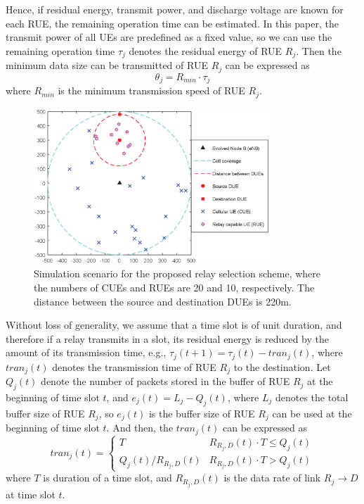 \documentclass[conference]{IEEEtran}
\begin{document}
Hence, if residual energy, transmit power, and discharge voltage are known for each RUE, the remaining operation time can be estimated. In this paper, the transmit power of all UEs are predefined as a fixed value, so we can use the remaining operation time $\tau_j$ denotes the residual energy of RUE $R_j$. Then the minimum data size can be transmitted of RUE $R_j$ can be expressed as
\begin{equation}
\theta_j = R_{min} \cdot \tau_j
\end{equation}
where $R_{min}$ is the minimum transmission speed of RUE $R_j$.
\begin{figure}[!t]
\center
\includegraphics[width=3.5in]{fig2}
\caption{Simulation scenario for the proposed relay selection scheme, where the numbers of CUEs and RUEs are 20 and 10, respectively. The distance between the source and destination DUEs is 220m.}
\label{fig_scenario}
\end{figure}
Without loss of generality, we assume that a time slot is of unit duration, and therefore if a relay transmits in a slot, its residual energy is reduced by the amount of its transmission time, e.g., $\tau_j(t+1) = \tau_j(t) - tran_j(t)$, where $tran_j(t)$ denotes the transmission time of RUE $R_j$ to the destination. Let $Q_j(t)$ denote the number of packets stored in the buffer of RUE $R_j$ at the beginning of time slot $t$, and $e_j(t) = L_j -  Q_j(t)$, where $L_j$ denotes the total buffer size of RUE $R_j$, so $e_j(t)$ is the buffer size of RUE $R_j$ can be used at the beginning of time slot $t$. And then, the $tran_j(t)$ can be expressed as
\begin{equation}
tran_j(t) = \begin{cases}T & R_{R_j,D}(t)\cdot T \leq Q_j(t)\\Q_j(t)/R_{R_j,D}(t) & R_{R_j,D}(t)\cdot T > Q_j(t)\end{cases}
\end{equation}
where $T$ is duration of a time slot, and $R_{R_j,D}(t)$ is the data rate of link $R_j \rightarrow D$ at time slot $t$.
\end{document}
